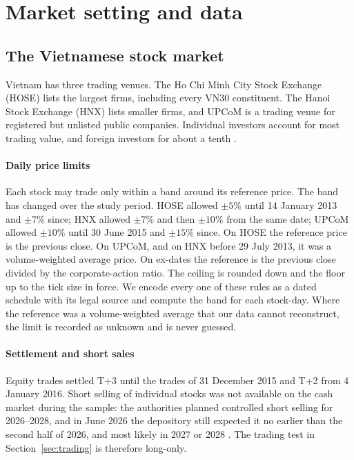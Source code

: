 \section{Market setting and data}\label{sec:data}

\subsection{The Vietnamese stock market}\label{sec:market}

Vietnam has three trading venues. The Ho Chi Minh City Stock Exchange (HOSE) lists the largest
firms, including every VN30 constituent. The Hanoi Stock Exchange (HNX) lists smaller firms, and
UPCoM is a trading venue for registered but unlisted public companies. Individual investors account
for most trading value, and foreign investors for about a tenth \citep{SHS2025,HOSE2025}.

\paragraph{Daily price limits} Each stock may trade only within a band around its reference price.
The band has changed over the study period. HOSE allowed $\pm5\%$ until 14 January 2013 and $\pm7\%$
since; HNX allowed $\pm7\%$ and then $\pm10\%$ from the same date; UPCoM allowed $\pm10\%$ until 30
June 2015 and $\pm15\%$ since. On HOSE the reference price is the previous close. On UPCoM, and on
HNX before 29 July 2013, it was a volume-weighted average price. On ex-dates the reference is the
previous close divided by the corporate-action ratio. The ceiling is rounded down and the floor up to
the tick size in force. We encode every one of these rules as a dated schedule with its legal source
and compute the band for each stock-day. Where the reference was a volume-weighted average that our
data cannot reconstruct, the limit is recorded as unknown and is never guessed.

\paragraph{Settlement and short sales} Equity trades settled T+3 until the trades of 31 December
2015 and T+2 from 4 January 2016. Short selling of individual stocks was not available on the cash market during the sample:
the authorities planned controlled short selling for 2026--2028, and in June 2026 the depository
still expected it no earlier than the second half of 2026, and most likely in 2027 or 2028
\citep{TheInvestor2025,NguoiQuanSat2026}. The trading test in Section~\ref{sec:trading} is
therefore long-only.

